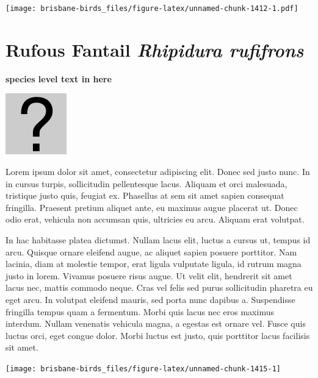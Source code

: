 \documentclass[]{book}
\let\origfigure\figure
\let\endorigfigure\endfigure
\renewenvironment{figure}[1][2] {
  \expandafter\origfigure\expandafter[H]
} {
  \endorigfigure
}
\begin{document}
\begin{figure}
\centering
\texttt{[image: brisbane-birds\_files/figure-latex/unnamed-chunk-1412-1.pdf]}
\caption{\label{fig:unnamed-chunk-1412}insert figure caption}
\end{figure}

\section{\texorpdfstring{Rufous Fantail \emph{Rhipidura
rufifrons}}{Rufous Fantail Rhipidura rufifrons}}\label{rufous-fantail-rhipidura-rufifrons}

\textbf{species level text in here}

\begin{figure}
\centering
\includegraphics{assets/missing.png}
\caption{No image for species}
\end{figure}

Lorem ipsum dolor sit amet, consectetur adipiscing elit. Donec sed justo
nunc. In in cursus turpis, sollicitudin pellentesque lacus. Aliquam et
orci malesuada, tristique justo quis, feugiat ex. Phasellus at sem sit
amet sapien consequat fringilla. Praesent pretium aliquet ante, eu
maximus augue placerat ut. Donec odio erat, vehicula non accumsan quis,
ultricies eu arcu. Aliquam erat volutpat.

In hac habitasse platea dictumst. Nullam lacus elit, luctus a cursus ut,
tempus id arcu. Quisque ornare eleifend augue, ac aliquet sapien posuere
porttitor. Nam lacinia, diam at molestie tempor, erat ligula vulputate
ligula, id rutrum magna justo in lorem. Vivamus posuere risus augue. Ut
velit elit, hendrerit sit amet lacus nec, mattis commodo neque. Cras vel
felis sed purus sollicitudin pharetra eu eget arcu. In volutpat eleifend
mauris, sed porta nunc dapibus a. Suspendisse fringilla tempus quam a
fermentum. Morbi quis lacus nec eros maximus interdum. Nullam venenatis
vehicula magna, a egestas est ornare vel. Fusce quis luctus orci, eget
congue dolor. Morbi luctus est justo, quis porttitor lacus facilisis sit
amet.

\begin{figure}
\texttt{[image: brisbane-birds\_files/figure-latex/unnamed-chunk-1415-1]} \caption{insert figure caption}\label{fig:unnamed-chunk-1415}
\end{figure}
\end{document}
